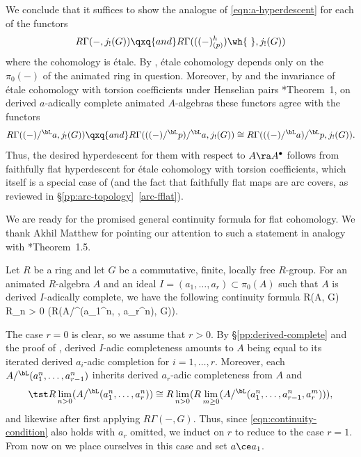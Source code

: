 We conclude that it suffices to show the analogue of \eqref{eqn:a-hyperdescent} for each of the functors
\[
R\Gamma(-, j_!(G)) \qxq{and} R\Gamma(((-)^h_{(p)})\wh{\ }, j_!(G))
\]
where the cohomology is \'{e}tale. By , \'{e}tale cohomology depends only on the $\pi_0(-)$ of the animated ring in question. Moreover, by  and the invariance of \'{e}tale cohomology with torsion coefficients under Henselian pairs \cite{Gab94a}*{Theorem~1}, on derived $a$-adically complete animated $A$-algebras these functors agree with the functors
\[
R\Gamma((-)/^\bL a, j_!(G)) \qxq{and} R\Gamma(((-)/^\bL p)/^\bL a, j_!(G)) \cong R\Gamma(((-)/^\bL a)/^\bL p, j_!(G)).
\]
Thus, the desired hyperdescent for them with respect to $A \ra A^\bullet$ follows from faithfully flat hyperdescent for \'{e}tale cohomology with torsion coefficients, which itself is a special case of  (and the fact that faithfully flat maps are arc covers, as reviewed in \S\ref{pp:arc-topology}~\ref{arc-fflat}).
\epf













We are ready for the promised general continuity formula for flat cohomology. We thank Akhil Matthew for pointing our attention to such a statement in analogy with \cite{DM17}*{Theorem~1.5}.

\bthm \label{adic-continuity}
Let $R$ be a ring and let  $G$ be a commutative, finite, locally free $R$-group. For an animated $R$-algebra $A$ and an ideal $I = (a_1, \dotsc, a_r) \subset \pi_0(A)$ such that $A$ is derived $I$-adically complete, we have the following continuity formula\ucolon
\be \label{eqn:genl-continuity}
\tst R\Gamma(A, G) \isomto R\lim_{n > 0} (R\Gamma(A/^\bL (a_1^n, \dotsc, a_r^n), G)).
\ee
\ethm

\bpf
The case $r = 0$ is clear, so we assume that $r > 0$. By \S\ref{pp:derived-complete} and the proof of , derived $I$-adic completeness amounts to $A$ being equal to its iterated derived $a_i$-adic completion for $i = 1, \dotsc, r$. %
Moreover, each $A/^\bL (a_1^n, \dotsc, a_{r - 1}^n)$ inherits derived $a_r$-adic completeness from $A$ and %
\[
\tst R\lim_{n > 0} (A/^\bL (a_1^n, \dotsc, a_r^n)) \cong R\lim_{n > 0} (R\lim_{m \ge 0} (A/^\bL (a_1^n, \dotsc, a_{r - 1}^n, a_r^m))),
\]
and likewise after first applying $R\Gamma(-, G)$. Thus, since \eqref{eqn:continuity-condition} also holds with $a_r$ omitted, we induct on $r$ to reduce  to the case $r = 1$. From now on we place ourselves in this case and set $a \ce a_1$.

